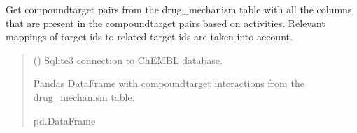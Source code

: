 \documentclass[letterpaper,10pt,english]{sphinxmanual}
\begin{document}

\begin{fulllineitems}
\label{\detokenize{get_drug_mechanism_ct_pairs:get_drug_mechanism_ct_pairs.get_drug_mechanism_ct_pairs}}
\pysigstartsignatures
{}
\pysigstopsignatures
\sphinxAtStartPar
Get compound\sphinxhyphen{}target pairs from the drug\_mechanism table
with all the columns that are present in the compound\sphinxhyphen{}target pairs based on activities.
Relevant mappings of target ids to related target ids are taken into account.
\begin{quote}\begin{description}
\sphinxAtStartPar
{} () \textendash{} Sqlite3 connection to ChEMBL database.

\sphinxAtStartPar
Pandas DataFrame with compound\sphinxhyphen{}target interactions from the drug\_mechanism table.

\sphinxAtStartPar
pd.DataFrame

\end{description}\end{quote}

\end{fulllineitems}

\end{document}
